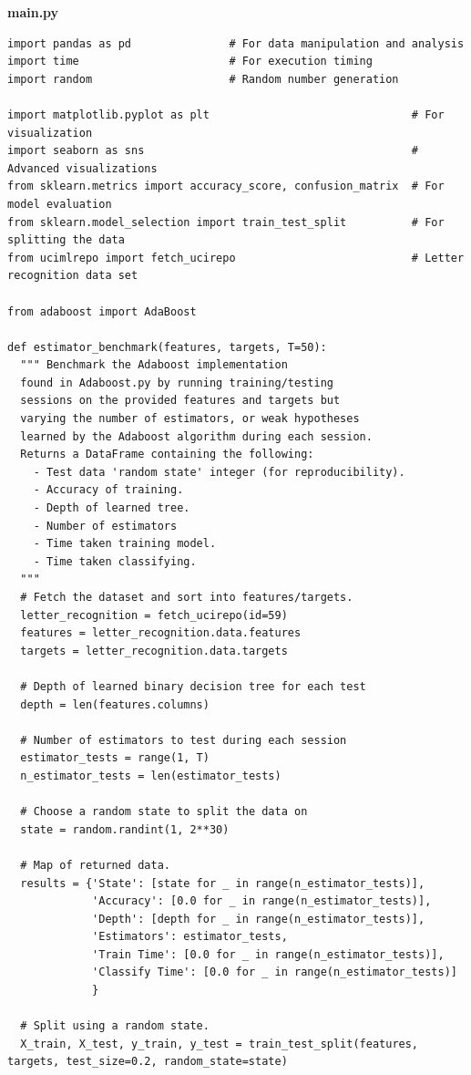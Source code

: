 \documentclass[a4paper]{article}
\begin{document}
\textbf{main.py}
\begin{lstlisting}[basicstyle= \scriptsize]
import pandas as pd               # For data manipulation and analysis
import time                       # For execution timing
import random                     # Random number generation

import matplotlib.pyplot as plt                               # For visualization
import seaborn as sns                                         # Advanced visualizations
from sklearn.metrics import accuracy_score, confusion_matrix  # For model evaluation
from sklearn.model_selection import train_test_split          # For splitting the data
from ucimlrepo import fetch_ucirepo                           # Letter recognition data set

from adaboost import AdaBoost

def estimator_benchmark(features, targets, T=50):
  """ Benchmark the Adaboost implementation
  found in Adaboost.py by running training/testing
  sessions on the provided features and targets but
  varying the number of estimators, or weak hypotheses
  learned by the Adaboost algorithm during each session.
  Returns a DataFrame containing the following:
    - Test data 'random state' integer (for reproducibility).
    - Accuracy of training.
    - Depth of learned tree.
    - Number of estimators
    - Time taken training model.
    - Time taken classifying.
  """
  # Fetch the dataset and sort into features/targets.
  letter_recognition = fetch_ucirepo(id=59) 
  features = letter_recognition.data.features
  targets = letter_recognition.data.targets
  
  # Depth of learned binary decision tree for each test
  depth = len(features.columns) 

  # Number of estimators to test during each session
  estimator_tests = range(1, T)
  n_estimator_tests = len(estimator_tests)

  # Choose a random state to split the data on
  state = random.randint(1, 2**30)

  # Map of returned data.
  results = {'State': [state for _ in range(n_estimator_tests)],
             'Accuracy': [0.0 for _ in range(n_estimator_tests)],
             'Depth': [depth for _ in range(n_estimator_tests)],
             'Estimators': estimator_tests,
             'Train Time': [0.0 for _ in range(n_estimator_tests)],
             'Classify Time': [0.0 for _ in range(n_estimator_tests)]
             }
  
  # Split using a random state.
  X_train, X_test, y_train, y_test = train_test_split(features, targets, test_size=0.2, random_state=state)


\end{lstlisting}
\end{document}
